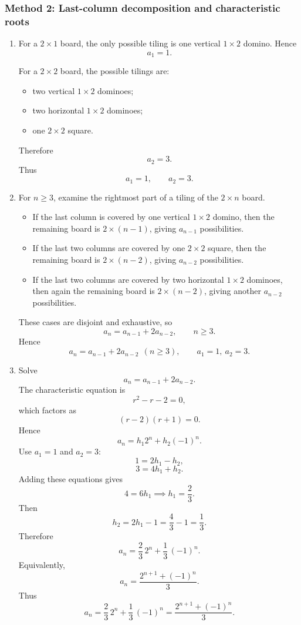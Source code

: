 \documentclass[12pt]{article}
\begin{document}
\subsubsection*{Method 2: Last-column decomposition and characteristic roots}
\begin{enumerate}[label=(\alph*)]
\item For a \(2\times 1\) board, the only possible tiling is one vertical \(1\times 2\) domino. Hence
\[
a_1=1.
\]

For a \(2\times 2\) board, the possible tilings are:
\begin{itemize}[leftmargin=*]
  \item two vertical \(1\times 2\) dominoes;
  \item two horizontal \(1\times 2\) dominoes;
  \item one \(2\times 2\) square.
\end{itemize}
Therefore
\[
a_2=3.
\]
Thus
\[
\boxed{a_1=1,\qquad a_2=3.}
\]

\item For \(n\ge 3\), examine the rightmost part of a tiling of the \(2\times n\) board.

\begin{itemize}[leftmargin=*]
  \item If the last column is covered by one vertical \(1\times 2\) domino, then the remaining board is \(2\times (n-1)\), giving \(a_{n-1}\) possibilities.
  \item If the last two columns are covered by one \(2\times 2\) square, then the remaining board is \(2\times (n-2)\), giving \(a_{n-2}\) possibilities.
  \item If the last two columns are covered by two horizontal \(1\times 2\) dominoes, then again the remaining board is \(2\times (n-2)\), giving another \(a_{n-2}\) possibilities.
\end{itemize}

These cases are disjoint and exhaustive, so
\[
a_n=a_{n-1}+2a_{n-2}, \qquad n\ge 3.
\]
Hence
\[
\boxed{a_n=a_{n-1}+2a_{n-2}\ \ (n\ge 3), \qquad a_1=1,\ a_2=3.}
\]

\item Solve
\[
a_n=a_{n-1}+2a_{n-2}.
\]
The characteristic equation is
\[
r^2-r-2=0,
\]
which factors as
\[
(r-2)(r+1)=0.
\]
Hence
\[
a_n=h_1 2^n+h_2(-1)^n.
\]
Use \(a_1=1\) and \(a_2=3\):
\[
1=2h_1-h_2,
\]
\[
3=4h_1+h_2.
\]
Adding these equations gives
\[
4=6h_1 \implies h_1=\frac23.
\]
Then
\[
h_2=2h_1-1=\frac43-1=\frac13.
\]
Therefore
\[
a_n=\frac23\,2^n+\frac13\,(-1)^n.
\]
Equivalently,
\[
a_n=\frac{2^{n+1}+(-1)^n}{3}.
\]
Thus
\[
\boxed{a_n=\frac23\,2^n+\frac13\,(-1)^n=\frac{2^{n+1}+(-1)^n}{3}.}
\]
\end{enumerate}
\end{document}
